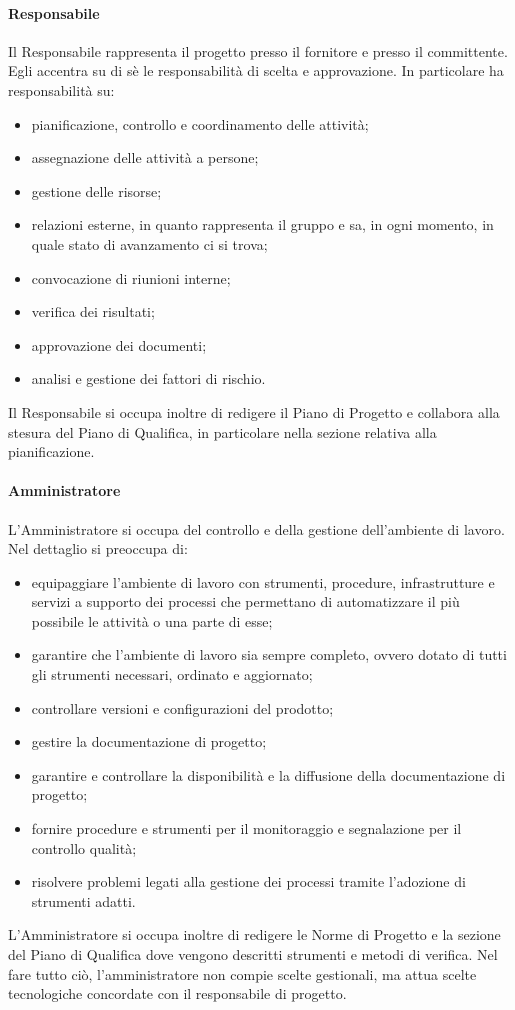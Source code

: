			\paragraph{Responsabile}
				Il Responsabile rappresenta il progetto presso il fornitore e presso il committente. Egli accentra su di sè le responsabilità di scelta e approvazione. In particolare ha responsabilità su:
				\begin{itemize}
					\item pianificazione, controllo e coordinamento delle attività;
					\item assegnazione delle attività a persone;
					\item gestione delle risorse;
					\item relazioni esterne, in quanto rappresenta il gruppo e sa, in ogni momento, in quale stato di avanzamento ci si trova;
					\item convocazione di riunioni interne;
					\item verifica dei risultati;
					\item approvazione dei documenti;
					\item analisi e gestione dei fattori di rischio.
				\end{itemize}
				Il Responsabile si occupa inoltre di redigere il Piano di Progetto e collabora alla stesura del Piano di Qualifica, in particolare nella sezione relativa alla pianificazione.
			\paragraph{Amministratore}
				L'Amministratore si occupa del controllo e della gestione dell'ambiente di lavoro. Nel dettaglio si preoccupa di:
				\begin{itemize}
					\item equipaggiare l'ambiente di lavoro con strumenti, procedure, infrastrutture e servizi a supporto dei processi che permettano di automatizzare il più possibile le attività o una parte di esse;
					\item garantire che l’ambiente di lavoro sia sempre completo, ovvero dotato di tutti gli strumenti necessari, ordinato e aggiornato;
					\item controllare versioni e configurazioni del prodotto;
					\item gestire la documentazione di progetto;
					\item garantire e controllare la disponibilità e la diffusione della documentazione di progetto;
					\item fornire procedure e strumenti per il monitoraggio e segnalazione per il controllo qualità;
					\item risolvere problemi legati alla gestione dei processi tramite l'adozione di strumenti adatti.
				\end{itemize}
				L'Amministratore si occupa inoltre di redigere le Norme di Progetto e la sezione del Piano di Qualifica dove vengono descritti strumenti e metodi di verifica. Nel fare tutto ciò, l'amministratore non compie scelte gestionali, ma attua scelte tecnologiche concordate con il responsabile di progetto.
